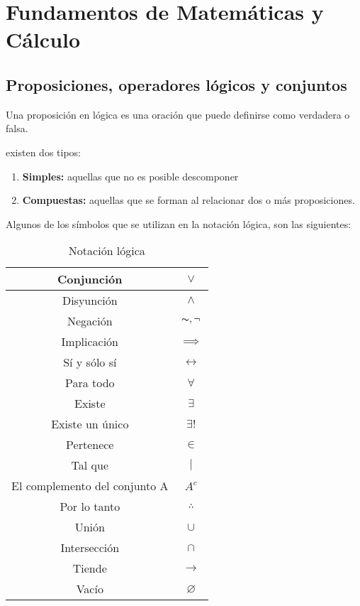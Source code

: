 \chapter{Fundamentos de Matemáticas y Cálculo}


\section{Proposiciones, operadores lógicos y conjuntos}

\begin{definition}[Proposición]
	Una proposición en lógica es una oración que puede definirse como verdadera o falsa.
\end{definition}

existen dos tipos:

\begin{enumerate}
	\item \textbf{Simples:} aquellas que no es posible descomponer
	\item \textbf{Compuestas:} aquellas que se forman al relacionar dos o más proposiciones.
\end{enumerate}

Algunos de los símbolos que se utilizan en la notación lógica, son las siguientes:

\begin{table}[h!]
	\centering
	\begin{tabular}{|c|c|}
		\hline
		Conjunción                    & $\lor$                \\ \hline
		Disyunción                    & $\land$               \\ \hline
		Negación                      & $\thicksim, \lnot$    \\ \hline
		Implicación                   & $\implies$            \\ \hline
		Sí y sólo sí                  & $\longleftrightarrow$ \\ \hline
		Para todo                     & $\forall$             \\ \hline
		Existe                        & $\exists$             \\ \hline
		Existe un único               & $\exists! $           \\ \hline
		Pertenece                     & $\in$                 \\ \hline
		Tal que                       & $|$                   \\ \hline
		El complemento del conjunto A & $A^{c}$               \\ \hline
		Por lo tanto                  & $\therefore $         \\ \hline
		Unión                         & $\cup$                \\ \hline
		Intersección                  & $\cap$                \\ \hline
		Tiende                        & $\rightarrow$         \\ \hline
		Vacío                         & $\varnothing$         \\ \hline
	\end{tabular}
	\caption{Notación lógica}
	\label{tabfmc1}
\end{table}


